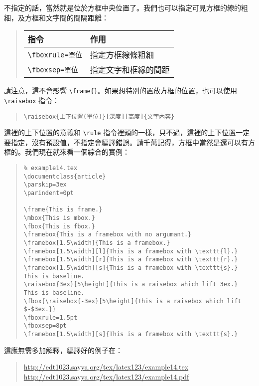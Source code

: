 不指定的話，當然就是位於方框中央位置了。我們也可以指定可見方框的線的粗細，及方框和文字間的間隔距離：

\begin{quote}
   \begin{tabular}{ll}
      指令                     & 作用                 \\
      \hline
      \verb|\fboxrule=單位| & 指定方框線條粗細     \\
      \verb|\fboxsep=單位| & 指定文字和框緣的間距 %
      \index{fboxrule@\verb=\fboxrule=}\index{fboxsep@\verb=\fboxsep=}%
   \end{tabular}
\end{quote}

請注意，這不會影響 \verb|\frame{}|。如果想特別的置放方框的位置，也可以使用 \verb|\raisebox| 指令：

\begin{quote}
   \begin{verbatim}
\raisebox{上下位置(單位)}[深度][高度]{文字內容}
\end{verbatim}
\end{quote}

這裡的上下位置的意義和 \verb|\rule| 指令裡頭的一樣，只不過，這裡的上下位置一定要指定，沒有預設值，不指定會編譯錯誤。請千萬記得，方框中當然是還可以有方框的。我們現在就來看一個綜合的實例：

\begin{quote}
   \begin{verbatim}
% example14.tex
\documentclass{article}
\parskip=3ex
\parindent=0pt

\frame{This is frame.}
\mbox{This is mbox.}
\fbox{This is fbox.}
\framebox{This is a framebox with no argumant.}
\framebox[1.5\width]{This is a framebox.}
\framebox[1.5\width][l]{This is a framebox with \texttt{l}.}
\framebox[1.5\width][r]{This is a framebox with \texttt{r}.}
\framebox[1.5\width][s]{This is a framebox with \texttt{s}.}
This is baseline.
\raisebox{3ex}[5\height]{This is a raisebox which lift 3ex.}
This is baseline.
\fbox{\raisebox{-3ex}[5\height]{This is a raisebox which lift $-$3ex.}}
\fboxrule=1.5pt
\fboxsep=8pt
\framebox[1.5\width][s]{This is a framebox with \texttt{s}.}

\end{verbatim}
\end{quote}

這應無需多加解釋，編譯好的例子在：

\begin{quote}
   \url{http://edt1023.sayya.org/tex/latex123/example14.tex}\\
   \url{http://edt1023.sayya.org/tex/latex123/example14.pdf}
\end{quote}

